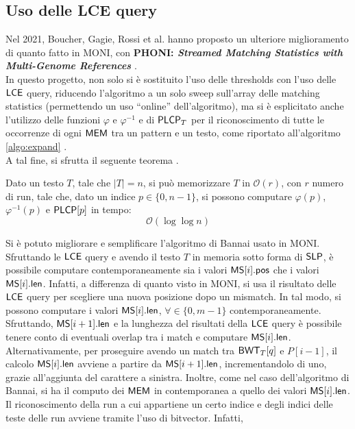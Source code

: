 \subsection{Uso delle LCE query}
Nel 2021, Boucher, Gagie, Rossi et al. hanno proposto un ulteriore
miglioramento di
quanto fatto in MONI, con \textbf{PHONI: \textit{Streamed Matching
    Statistics with Multi-Genome References}} \cite{phoni}.\\
In questo progetto, non solo si è sostituito l'uso delle thresholds con
l'uso delle $\mbox{\rm {\sf LCE}}$ query, riducendo l'algoritmo a un solo sweep
sull'array delle matching statistics (permettendo un uso ``online''
dell'algoritmo), ma si 
è esplicitato anche l'utilizzo delle funzioni $\varphi$ e
$\varphi^{-1}$ e di $\mbox{\rm {\sf PLCP}}_T$ per il riconoscimento di tutte le
occorrenze di ogni $\mbox{\rm {\sf MEM}}$ tra un pattern e un testo, come
riportato all'algoritmo \ref{algo:expand} \cite{phoni}.\\
A tal fine, si sfrutta il seguente teorema \cite{gagie2020}.
\begin{teorema}
  Dato un testo $T$, tale che $|T|=n$, si può memorizzare $T$ in
  $\mathcal{O}(r)$, con $r$ numero di run, tale che, dato un indice
  $p\in\{0,n-1\}$, si possono computare $\varphi(p)$, $\varphi^{-1}(p)$ e
  $\mbox{\rm {\sf PLCP}}[p]$ in tempo:
  \begin{equation}
    \label{eq:rlpbwt9}
    \mathcal{O}(\log\log n)
  \end{equation}
\end{teorema}
Si è potuto migliorare e semplificare l'algoritmo di Bannai
usato in MONI. Sfruttando le
$\mbox{\rm {\sf LCE}}$ query e avendo il testo $T$ in memoria sotto forma di $\mbox{\rm {\sf SLP}}$,
è possibile computare contemporaneamente sia i valori
$\mbox{\rm {\sf MS}}[i].\mbox{\rm {\sf pos}}$ che i valori $\mbox{\rm {\sf MS}}[i].\mbox{\rm {\sf len}}$. Infatti, a differenza di quanto visto
in MONI, si usa il 
risultato delle $\mbox{\rm {\sf LCE}}$ query per scegliere una nuova posizione dopo un mismatch.
In tal modo,
si possono computare i valori 
$\mbox{\rm {\sf MS}}[i].\mbox{\rm {\sf len}}$, $\forall \in \{0,m-1\}$ contemporaneamente. Sfruttando,
$\mbox{\rm {\sf MS}}[i+1].\mbox{\rm {\sf len}}$ e
la lunghezza del risultati 
della $\mbox{\rm {\sf LCE}}$ query è possibile tenere conto di eventuali overlap tra i
match e computare $\mbox{\rm {\sf MS}}[i].\mbox{\rm {\sf len}}$. Alternativamente, per
proseguire avendo un match tra  
$\mbox{\rm {\sf BWT}}_T[q]$ e $P[i-1]$, il calcolo $\mbox{\rm {\sf MS}}[i].\mbox{\rm {\sf len}}$ avviene a partire da
$\mbox{\rm {\sf MS}}[i+1].\mbox{\rm {\sf len}}$, incrementandolo di uno, grazie all'aggiunta del carattere a
sinistra. 
Inoltre, come nel caso dell'algoritmo
di Bannai, si ha il computo dei $\mbox{\rm {\sf MEM}}$ in contemporanea a quello dei valori 
$\mbox{\rm {\sf MS}}[i].\mbox{\rm {\sf len}}$.
Il riconoscimento della run a cui appartiene un certo indice e degli indici
delle teste delle run avviene tramite l'uso di bitvector. Infatti,
